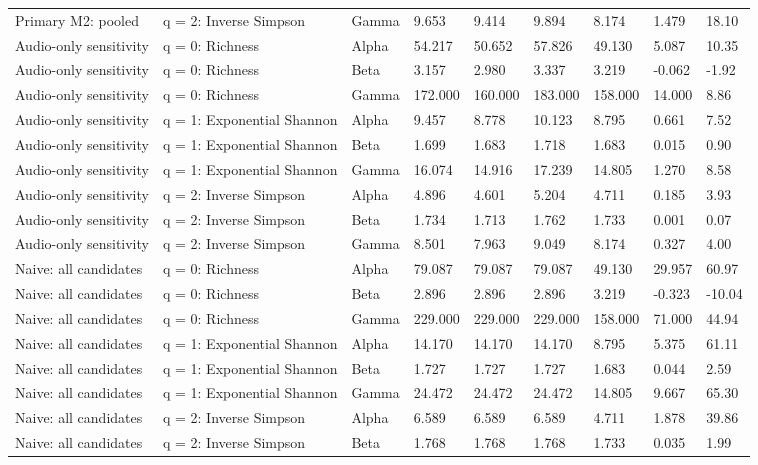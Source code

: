 \begin{landscape}
\begin{longtable}{L{3.4cm}L{2.5cm}L{1.6cm}*{6}{C{1.55cm}}}
Primary M2: pooled & q = 2: Inverse Simpson & Gamma & 9.653 & 9.414 & 9.894 & 8.174 & 1.479 & 18.10 \\
Audio-only sensitivity & q = 0: Richness & Alpha & 54.217 & 50.652 & 57.826 & 49.130 & 5.087 & 10.35 \\
Audio-only sensitivity & q = 0: Richness & Beta & 3.157 & 2.980 & 3.337 & 3.219 & -0.062 & -1.92 \\
Audio-only sensitivity & q = 0: Richness & Gamma & 172.000 & 160.000 & 183.000 & 158.000 & 14.000 & 8.86 \\
Audio-only sensitivity & q = 1: Exponential Shannon & Alpha & 9.457 & 8.778 & 10.123 & 8.795 & 0.661 & 7.52 \\
Audio-only sensitivity & q = 1: Exponential Shannon & Beta & 1.699 & 1.683 & 1.718 & 1.683 & 0.015 & 0.90 \\
Audio-only sensitivity & q = 1: Exponential Shannon & Gamma & 16.074 & 14.916 & 17.239 & 14.805 & 1.270 & 8.58 \\
Audio-only sensitivity & q = 2: Inverse Simpson & Alpha & 4.896 & 4.601 & 5.204 & 4.711 & 0.185 & 3.93 \\
Audio-only sensitivity & q = 2: Inverse Simpson & Beta & 1.734 & 1.713 & 1.762 & 1.733 & 0.001 & 0.07 \\
Audio-only sensitivity & q = 2: Inverse Simpson & Gamma & 8.501 & 7.963 & 9.049 & 8.174 & 0.327 & 4.00 \\
Naive: all candidates & q = 0: Richness & Alpha & 79.087 & 79.087 & 79.087 & 49.130 & 29.957 & 60.97 \\
Naive: all candidates & q = 0: Richness & Beta & 2.896 & 2.896 & 2.896 & 3.219 & -0.323 & -10.04 \\
Naive: all candidates & q = 0: Richness & Gamma & 229.000 & 229.000 & 229.000 & 158.000 & 71.000 & 44.94 \\
Naive: all candidates & q = 1: Exponential Shannon & Alpha & 14.170 & 14.170 & 14.170 & 8.795 & 5.375 & 61.11 \\
Naive: all candidates & q = 1: Exponential Shannon & Beta & 1.727 & 1.727 & 1.727 & 1.683 & 0.044 & 2.59 \\
Naive: all candidates & q = 1: Exponential Shannon & Gamma & 24.472 & 24.472 & 24.472 & 14.805 & 9.667 & 65.30 \\
Naive: all candidates & q = 2: Inverse Simpson & Alpha & 6.589 & 6.589 & 6.589 & 4.711 & 1.878 & 39.86 \\
Naive: all candidates & q = 2: Inverse Simpson & Beta & 1.768 & 1.768 & 1.768 & 1.733 & 0.035 & 1.99 \\

\end{longtable}
\end{landscape}
